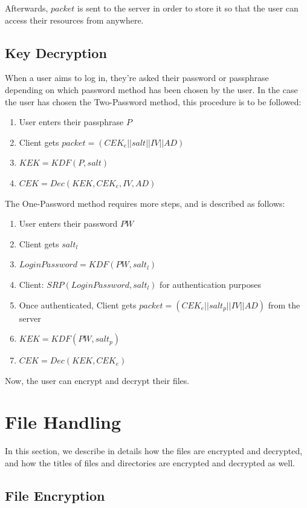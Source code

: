 \documentclass[a4paper,9pt,twoside]{article}
\begin{document}
Afterwards, $packet$ is sent to the server in order to store it so that 
the user can access their resources from anywhere.

\subsection{Key Decryption}

When a user aims to log in, they're asked their password or passphrase 
depending on 
which password method has been chosen by the user. 
In the case the user has chosen the Two-Password method, this procedure is to be followed:

\begin{enumerate}
\itemsep0em
\item User enters their passphrase $P$
\item Client gets $packet=(CEK_e||salt||IV||AD)$
\item $KEK=KDF(P, salt)$
\item $CEK=Dec(KEK, CEK_e, IV, AD)$
\end{enumerate}

The One-Password method requires more steps, and is described as follows:

\begin{enumerate}
\itemsep0em
\item User enters their password $PW$
\item Client gets $salt_l$
\item $LoginPassword=KDF(PW, salt_l)$
\item Client: $SRP(LoginPassword, salt_l)$ for authentication purposes
\item Once authenticated, Client gets $packet=(CEK_e||salt_p||IV||AD)$ from the server
\item $KEK=KDF(PW, salt_p)$
\item $CEK=Dec(KEK, CEK_e)$ 
\end{enumerate}

Now, the user can encrypt and decrypt their files.

\section{File Handling}

    In this section, we describe in details how the files are encrypted and decrypted, 
and how the titles of files and directories are encrypted and decrypted as well.

\subsection{File Encryption}
\end{document}
